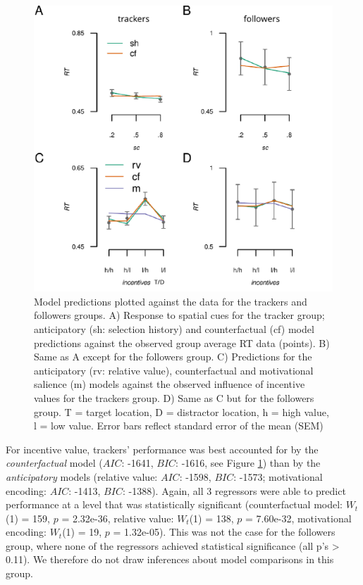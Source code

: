 \documentclass[11pt,halfline,a4paper,]{ouparticle}
\begin{document}
\begin{figure}[p]

{\centering \includegraphics[width=1\linewidth]{../images/doc-clust-grp-behav_model-fits} 

}

\caption{Model predictions plotted against the data for the trackers and followers groups. A) Response to spatial cues for the tracker group; anticipatory (sh: selection history) and counterfactual (cf) model predictions against the observed group average RT data (points). B) Same as A except for the followers group. C) Predictions for the anticipatory (rv: relative value), counterfactual and motivational salience (m) models against the observed influence of incentive values for the trackers group. D) Same as C but for the followers group. T = target location, D = distractor location, h = high value, l = low value. Error bars reflect standard error of the mean (SEM)}\label{fig:clustgrpModels}
\end{figure}

For incentive value, trackers' performance was best accounted for by the \emph{counterfactual} model (\(AIC\): -1641, \(BIC\): -1616, see Figure \ref{fig:clustgrpModels}) than by the \emph{anticipatory} models (relative value: \(AIC\): -1598, \(BIC\): -1573; motivational encoding: \(AIC\): -1413, \(BIC\): -1388). Again, all 3 regressors were able to predict performance at a level that was statistically significant (counterfactual model: \(W_{t}\)(1) = 159, \(p\) = 2.32e-36, relative value: \(W_{t}\)(1) = 138, \(p\) = 7.60e-32, motivational encoding: \(W_{t}\)(1) = 19, \(p\) = 1.32e-05). This was not the case for the followers group, where none of the regressors achieved statistical significance (all p's \textgreater{} 0.11). We therefore do not draw inferences about model comparisons in this group.
\end{document}
